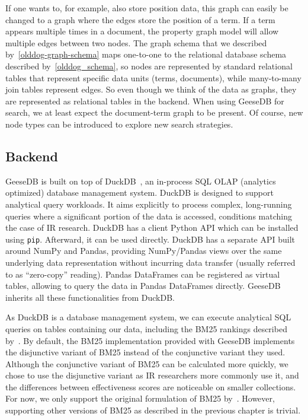 If one wants to, for example, also store position data, this graph can easily be changed to a graph where the edges store the position of a term. If a term appears multiple times in a document, the property graph model will allow multiple edges between two nodes. The graph schema that we described by~\cref{olddog-graph-schema} maps one-to-one to the relational database schema described by~\cref{olddog_schema}, so nodes are represented by standard relational tables that represent specific data units (terms, documents), while many-to-many join tables represent edges. So even though we think of the data as graphs, they are represented as relational tables in the backend. When using GeeseDB for search, we at least expect the document-term graph to be present. Of course, new node types can be introduced to explore new search strategies. 

\subsection{Backend}
GeeseDB is built on top of DuckDB~\citep{duckdb}, an in-process SQL OLAP (analytics optimized) database management system. DuckDB is designed to support analytical query workloads. It aims explicitly to process complex, long-running queries where a significant portion of the data is accessed, conditions matching the case of IR research. DuckDB has a client Python API which can be installed using \texttt{pip}. Afterward, it can be used directly. DuckDB has a separate API built around NumPy and Pandas, providing NumPy/Pandas views over the same underlying data representation without incurring data transfer (usually referred to as ``zero-copy'' reading). Pandas DataFrames can be registered as virtual tables, allowing to query the data in Pandas DataFrames directly. GeeseDB inherits all these functionalities from DuckDB.

As DuckDB is a database management system, we can execute analytical SQL queries on tables containing our data, including the BM25 rankings described by~\citet{OldDog}. By default, the BM25 implementation provided with GeeseDB implements the disjunctive variant of BM25 instead of the conjunctive variant they used. Although the conjunctive variant of BM25 can be calculated more quickly, we chose to use the disjunctive variant as IR researchers more commonly use it, and the differences between effectiveness scores are noticeable on smaller collections. For now, we only support the original formulation of BM25 by~\citet{bm25-robertson}. However, supporting other versions of BM25 as described in the previous chapter is trivial.

